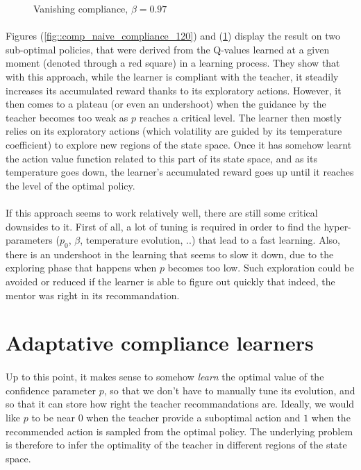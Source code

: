 \documentclass[a4paper]{report}
\begin{document}
{{{{\begin{figure}[ht!]
\begin{minipage}{0.5\linewidth}
\begin{center}
						\caption{Vanishing compliance, $\beta = 0.97$}
						\label{fig::comp_naive_compliance_50}
					\end{center}
				\end{minipage}
			\end{figure}
			
			\paragraph{} Figures (\ref{fig::comp_naive_compliance_120}) and (\ref{fig::comp_naive_compliance_50}) display the result on two sub-optimal policies, that were derived from the Q-values learned at a given moment (denoted through a red square) in a learning process. They show that with this approach, while the learner is compliant with the teacher, it steadily increases its accumulated reward thanks to its exploratory actions. However, it then comes to a plateau (or even an undershoot) when the guidance by the teacher becomes too weak as $p$ reaches a critical level. The learner then mostly relies on its exploratory actions (which volatility are guided by its temperature coefficient) to explore new regions of the state space. Once it has somehow learnt the action value function related to this part of its state space, and as its temperature goes down, the learner's accumulated reward goes up until it reaches the level of the optimal policy. 

		}		
		
		\paragraph{} If this approach seems to work relatively well, there are still some critical downsides to it. First of all, a lot of tuning is required in order to find the hyper-parameters ($p_0$, $\beta$, temperature evolution, ..) that lead to a fast learning. Also, there is an undershoot in the learning that seems to slow it down, due to the exploring phase that happens when $p$ becomes too low.  Such exploration could be avoided or reduced if the learner is able to figure out quickly that indeed, the mentor was right in its recommandation.
	}
	
	\section{Adaptative compliance learners}
	{	
		\label{section::adaptative_learners}
		\paragraph{} Up to this point, it makes sense to somehow \emph{learn} the optimal value of the confidence parameter $p$, so that we don't have to manually tune its evolution, and so that it can store how right the teacher recommandations are. Ideally, we would like $p$ to be near $0$ when the teacher provide a suboptimal action and $1$ when the recommended action is sampled from the optimal policy. The underlying problem is therefore to infer the optimality of the teacher in different regions of the state space. 
		
}}}
\end{document}
